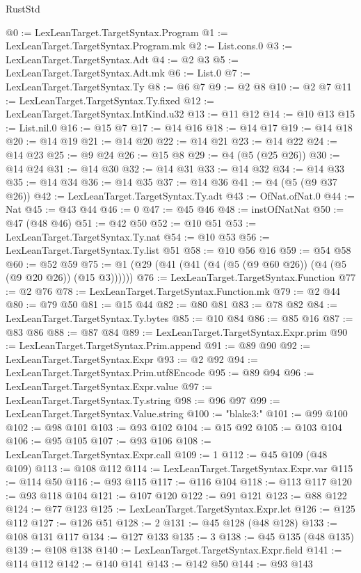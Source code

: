 \begin{lexlean}{RustStd}
\begin{coremodule}
@0 := LexLeanTarget.TargetSyntax.Program
@1 := LexLeanTarget.TargetSyntax.Program.mk
@2 := List.cons.{0}
@3 := LexLeanTarget.TargetSyntax.Adt
@4 := @2 @3
@5 := LexLeanTarget.TargetSyntax.Adt.mk
@6 := List.{0}
@7 := LexLeanTarget.TargetSyntax.Ty
@8 := @6 @7
@9 := @2 @8
@10 := @2 @7
@11 := LexLeanTarget.TargetSyntax.Ty.fixed
@12 := LexLeanTarget.TargetSyntax.IntKind.u32
@13 := @11 @12
@14 := @10 @13
@15 := List.nil.{0}
@16 := @15 @7
@17 := @14 @16
@18 := @14 @17
@19 := @14 @18
@20 := @14 @19
@21 := @14 @20
@22 := @14 @21
@23 := @14 @22
@24 := @14 @23
@25 := @9 @24
@26 := @15 @8
@29 := @4 (@5 (@25 @26))
@30 := @14 @24
@31 := @14 @30
@32 := @14 @31
@33 := @14 @32
@34 := @14 @33
@35 := @14 @34
@36 := @14 @35
@37 := @14 @36
@41 := @4 (@5 (@9 @37 @26))
@42 := LexLeanTarget.TargetSyntax.Ty.adt
@43 := OfNat.ofNat.{0}
@44 := Nat
@45 := @43 @44
@46 := 0
@47 := @45 @46
@48 := instOfNatNat
@50 := @47 (@48 @46)
@51 := @42 @50
@52 := @10 @51
@53 := LexLeanTarget.TargetSyntax.Ty.nat
@54 := @10 @53
@56 := LexLeanTarget.TargetSyntax.Ty.list @51
@58 := @10 @56 @16
@59 := @54 @58
@60 := @52 @59
@75 := @1 (@29 (@41 (@41 (@4 (@5 (@9 @60 @26)) (@4 (@5 (@9 @20 @26)) (@15 @3))))))
@76 := LexLeanTarget.TargetSyntax.Function
@77 := @2 @76
@78 := LexLeanTarget.TargetSyntax.Function.mk
@79 := @2 @44
@80 := @79 @50
@81 := @15 @44
@82 := @80 @81
@83 := @78 @82
@84 := LexLeanTarget.TargetSyntax.Ty.bytes
@85 := @10 @84
@86 := @85 @16
@87 := @83 @86
@88 := @87 @84
@89 := LexLeanTarget.TargetSyntax.Expr.prim
@90 := LexLeanTarget.TargetSyntax.Prim.append
@91 := @89 @90
@92 := LexLeanTarget.TargetSyntax.Expr
@93 := @2 @92
@94 := LexLeanTarget.TargetSyntax.Prim.utf8Encode
@95 := @89 @94
@96 := LexLeanTarget.TargetSyntax.Expr.value
@97 := LexLeanTarget.TargetSyntax.Ty.string
@98 := @96 @97
@99 := LexLeanTarget.TargetSyntax.Value.string
@100 := "blake3:"
@101 := @99 @100
@102 := @98 @101
@103 := @93 @102
@104 := @15 @92
@105 := @103 @104
@106 := @95 @105
@107 := @93 @106
@108 := LexLeanTarget.TargetSyntax.Expr.call
@109 := 1
@112 := @45 @109 (@48 @109)
@113 := @108 @112
@114 := LexLeanTarget.TargetSyntax.Expr.var
@115 := @114 @50
@116 := @93 @115
@117 := @116 @104
@118 := @113 @117
@120 := @93 @118 @104
@121 := @107 @120
@122 := @91 @121
@123 := @88 @122
@124 := @77 @123
@125 := LexLeanTarget.TargetSyntax.Expr.let
@126 := @125 @112
@127 := @126 @51
@128 := 2
@131 := @45 @128 (@48 @128)
@133 := @108 @131 @117
@134 := @127 @133
@135 := 3
@138 := @45 @135 (@48 @135)
@139 := @108 @138
@140 := LexLeanTarget.TargetSyntax.Expr.field
@141 := @114 @112
@142 := @140 @141
@143 := @142 @50
@144 := @93 @143

\end{coremodule}
\end{lexlean}

